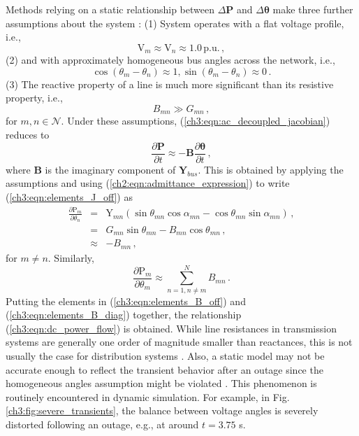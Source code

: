 Methods relying on a static relationship between $\Delta\textbf{P}$ and $\Delta\boldsymbol{\theta}$ make three further assumptions about the system \cite{Tate2008, Chen2016}: (1) System operates with a flat voltage profile, i.e., 
$$
\text{V}_m \approx \text{V}_n \approx 1.0 \, \text{p.u.} \,,
$$
(2) and with approximately homogeneous bus angles across the network, i.e., 
$$
\cos(\theta_m - \theta_n) \approx 1, \sin(\theta_m - \theta_n) \approx 0 \,.
$$ 
(3) The reactive property of a line is much more significant than its resistive property, i.e., 
$$
B_{mn} \gg G_{mn} \,,
$$ 
for $m, n \in \mathcal{N}$. Under these assumptions, (\ref{ch3:eqn:ac_decoupled_jacobian}) reduces to
\begin{equation}
\label{ch3:eqn:dc_power_flow}
\frac{\partial \textbf{P}}{\partial t} \approx -\mathbf{B} \frac{\partial \boldsymbol{\theta}}{\partial t} \,,
\end{equation}
where $\mathbf{B}$ is the imaginary component of $\boldsymbol{Y}_{bus}$. 
This is obtained by applying the assumptions and using (\ref{ch2:eqn:admittance_expression}) to write (\ref{ch3:eqn:elements_J_off}) as
\begin{eqnarray}
\label{ch3:eqn:elements_B_off}
  \frac{\partial \text{P}_{m}}{\partial \theta_{n}} 
  & = & \text{Y}_{m n} \left( \sin \theta_{mn} \cos \alpha_{mn}  - \cos \theta_{mn} \sin \alpha_{mn} \right) \,, \nonumber\\
  & = & G_{m n}\sin \theta_{mn}  - B_{mn} \cos \theta_{mn} \,, \nonumber\\
  & \approx & - B_{mn} \,,
\end{eqnarray}
for $m \neq n$. Similarly,  
\begin{equation}
\label{ch3:eqn:elements_B_diag}
\frac{\partial \text{P}_{m}}{\partial \theta_{m}} \approx \sum_{ n=1, n \neq m}^{N} B_{mn} \,.
\end{equation} 
Putting the elements in (\ref{ch3:eqn:elements_B_off}) and (\ref{ch3:eqn:elements_B_diag}) together, the relationship (\ref{ch3:eqn:dc_power_flow}) is obtained. 
While line resistances in transmission systems are generally one order of magnitude smaller than reactances, this is not usually the case for distribution systems \cite{anderson1983stability}. Also, a static model may not be accurate enough to reflect the transient behavior after an outage since the homogeneous angles assumption might be violated \cite{kaye1984analysis}. This phenomenon is routinely encountered in dynamic simulation. For example, in Fig. \ref{ch3:fig:severe_transients}, the balance between voltage angles is severely distorted following an outage, e.g., at around $t = 3.75$ s.
